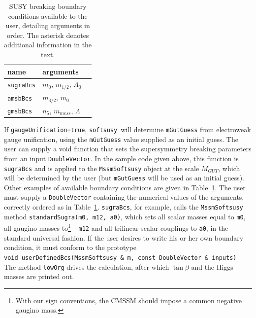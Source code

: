 \documentclass{article}
\def\code#1{\small{\tt #1}\normalsize}
\begin{document}
\begin{table}\begin{center}
\begin{tabular}[l]{lll} name & arguments \\ 
\hline
\code{sugraBcs} & $m_0$, $m_{1/2}$, $A_0$ \\
\code{amsbBcs} & $m_{3/2}$, $m_0$ \\
\code{gmsbBcs} & $n_5$, $m_{mess}$, $\Lambda$ \\
\end{tabular}\caption{\label{bcs} SUSY breaking boundary conditions available to the user, detailing arguments
in order. The asterisk denotes additional information in the text.}\end{center}\end{table}

If \code{gaugeUnification=true}, \code{softsusy}~will determine
\code{mGutGuess} from electroweak gauge unification, using
the \code{mGutGuess} value supplied as an initial guess. 
The user can supply a void function that sets the supersymmetry breaking
parameters from an input \code{DoubleVector}. In the sample code given above,
this function is
\code{sugraBcs} and is applied to the \code{MssmSoftsusy} object at the
scale $M_{GUT}$, which will be determined by the user (but \code{mGutGuess}
will be
used as an initial guess). 
Other examples of available boundary conditions are given in
Table~\ref{bcs}. 
The user must supply a \code{DoubleVector} containing the
numerical values of the arguments, correctly ordered as in
Table~\ref{bcs}.
\code{sugraBcs}, for example, calls the \code{MssmSoftsusy} method
\code{standardSugra(m0, m12, a0)}, which sets all scalar masses equal to
\code{m0}, 
all gaugino masses to\footnote{With our sign conventions, the CMSSM should
  impose a common negative gaugino mass.} $-$\code{m12} and all trilinear
scalar couplings to 
\code{a0}, in the standard universal fashion. 
If the user desires to write his or her own boundary condition, it must
conform to the prototype\\
\code{void userDefinedBcs(MssmSoftsusy \& m, const DoubleVector \& inputs)}\\
The method \code{lowOrg} drives the calculation, after which $\tan \beta$ and
the Higgs masses are
printed out.
\end{document}
